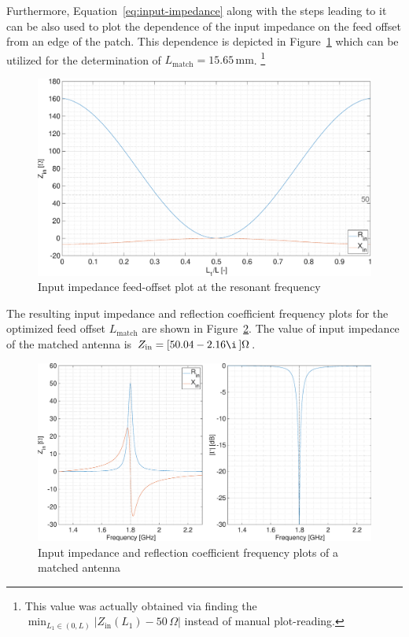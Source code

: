 \documentclass[11pt,a4paper]{article}
\begin{document}
            Furthermore, Equation~\ref{eq:input-impedance} along with the steps leading to it can be also used to plot the dependence of the input impedance on the feed offset from an edge of the patch. This dependence is depicted in Figure~\ref{fig:feed-offset-impedance-plot} which can be utilized for the determination of $L_{\mathrm{match}} = 15.65\, \mathrm{mm}$.%
                \footnote{This value was actually obtained via finding the $\min_{L_1 \in (0, L)}|Z_{\mathrm{in}}(L_1) - 50\, \Omega|$ instead of manual plot-reading.}
            \begin{figure}[!ht]
                \centering
                \includegraphics[width=.7\textwidth]{src/feed-offset-impedance-plot.eps}
                \caption{\label{fig:feed-offset-impedance-plot}Input impedance feed-offset plot at the resonant frequency}
            \end{figure}

            The resulting input impedance and reflection coefficient frequency plots for the optimized feed offset $L_{\mathrm{match}}$ are shown in Figure~\ref{fig:matched-antenna}. The value of input impedance of the matched antenna is $Z_{\mathrm{in}} = [50.04 - 2.16\i\,]\Omega$.
            \begin{figure}[!ht]
                \centering
                \includegraphics[width=\textwidth]{src/matched-antenna.eps}
                \caption{\label{fig:matched-antenna}Input impedance and reflection coefficient frequency plots of a matched antenna}
            \end{figure}
\end{document}
